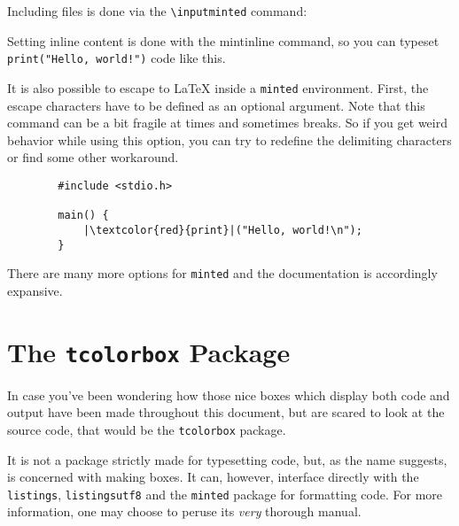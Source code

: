 \documentclass[article,a4paper,oneside,10pt]{memoir}
\newcommand\code[1]{\texttt{#1}}
\begin{document}
\newpage
Including files is done via the \verb|\inputminted| command:



\begin{tcblisting}{}
    Setting inline  content is done  with the  mintinline command, so  you can
    typeset \texttt{print("Hello, world!")} code like this.
\end{tcblisting}

It  is   also  possible   to  escape  to   \LaTeX{}  inside   a  \code{minted}
environment. First, the  escape characters have  to be defined as  an optional
argument.  Note that this command can be  a bit fragile at times and sometimes
breaks. So if you get  weird behavior while using this option,  you can try to
redefine the delimiting characters or find some other workaround.

\begin{tcblisting}{}
    \begin{verbatim}
        #include <stdio.h>

        main() {
            |\textcolor{red}{print}|("Hello, world!\n");
        }
    \end{verbatim}
\end{tcblisting}

There  are  many more  options  for  \code{minted}  and the  documentation  is
accordingly expansive.


\newpage
\chapter{The \code{tcolorbox} Package \cite{tcolorbox}}
\label{chap:tcolorbox}

In case you've been wondering how those nice boxes which display both code and
output have been made throughout this document,  but are scared to look at the
source code, that would be the \code{tcolorbox} package.

It is  not a  package strictly  made for  typesetting code,  but, as  the name
suggests, is concerned with making  boxes. It can, however, interface directly
with the  \code{listings}, \code{listingsutf8}  and the  \code{minted} package
for  formatting code. For  more  information,  one may  choose  to peruse  its
\emph{very} thorough manual\footnotemark.
\end{document}
